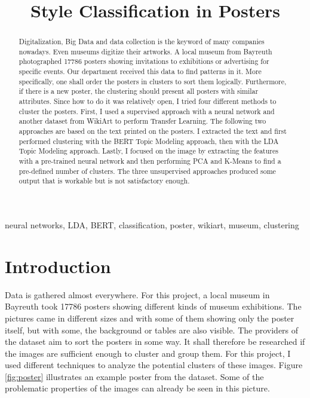 \documentclass[conference]{IEEEtran}
\begin{document}
\title{Style Classification in Posters\\
}

\author{
}


\maketitle

\begin{abstract}

Digitalization, Big Data and data collection is the keyword of many companies nowadays. Even museums digitize their artworks. A local museum from Bayreuth photographed 17786 posters showing invitations to exhibitions or advertising for specific events. Our department received this data to find patterns in it. More specifically, one shall order the posters in clusters to sort them logically.
Furthermore, if there is a new poster, the clustering should present all posters with similar attributes. Since how to do it was relatively open, I tried four different methods to cluster the posters. First, I used a supervised approach with a neural network and another dataset from WikiArt to perform Transfer Learning. The following two approaches are based on the text printed on the posters. I extracted the text and first performed clustering with the BERT Topic Modeling approach, then with the LDA Topic Modeling approach. Lastly, I focused on the image by extracting the features with a pre-trained neural network and then performing PCA and K-Means to find a pre-defined number of clusters. The three unsupervised approaches produced some output that is workable but is not satisfactory enough.

\end{abstract}
\begin{IEEEkeywords}
neural networks, LDA, BERT, classification, poster, wikiart, museum, clustering
\end{IEEEkeywords}

\section{Introduction}
Data is gathered almost everywhere. For this project, a local museum in Bayreuth took 17786 posters showing different kinds of museum exhibitions. The pictures came in different sizes and with some of them showing only the poster itself, but with some, the background or tables are also visible. The providers of the dataset aim to sort the posters in some way. It shall therefore be researched if the images are sufficient enough to cluster and group them. For this project, I used different techniques to analyze the potential clusters of these images. Figure \ref{fig:poster} illustrates an example poster from the dataset. Some of the problematic properties of the images can already be seen in this picture.
\end{document}
